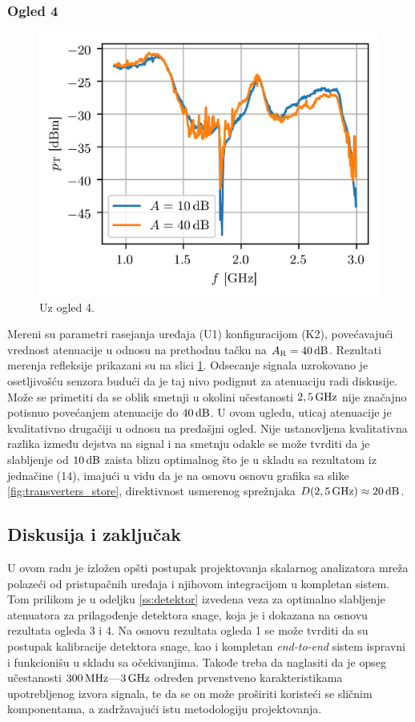 \documentclass[a4paper, 12pt, diplomski]{etf}
\renewcommand{\unit}[1]{\,{\rm #1}}   %
\begin{document}
\subsubsection{Ogled 4}
%
\begin{figure}[b!]
    \centering
    \includegraphics{fig/pR_bpf2.png}
    \caption{Uz ogled 4.}
    \label{fig:ogled4}
\end{figure}
%
Mereni su parametri rasejanja uređaja (U1) 
konfiguracijom (K2), povećavajući vrednost
atenuacije u odnosu na prethodnu tačku na
$A_{\rm R} = 40\unit{dB}$. Rezultati merenja 
refleksije prikazani su na slici 
\ref{fig:ogled4}. Odsecanje signala  
uzrokovano je osetljivošću senzora budući
da je taj nivo podignut za atenuaciju 
radi diskusije. Može se primetiti da se 
oblik smetnji u okolini učestanosti 
$2,5\unit{GHz}$ nije značajno potisnuo
povećanjem atenuacije do $40\unit{dB}$. 
U ovom ugledu, uticaj atenuacije je kvalitativno drugačiji
u odnosu na pređašjni ogled. Nije 
ustanovljena kvalitativna razlika između dejstva 
na signal i na smetnju odakle se može tvrditi da 
je slabljenje od $10 \unit{dB}$ zaista blizu optimalnog
što je u skladu sa rezultatom iz jednačine (14), 
imajući u vidu 
da je na osnovu osnovu grafika sa slike
\ref{fig:transverters_store}, direktivnost usmerenog
sprežnjaka $D(2,5\unit{GHz}) \approx 
20\unit{dB}$.

\subsection{Diskusija i zaključak}
U ovom radu je izložen opšti postupak projektovanja 
skalarnog analizatora mreža polazeći od pristupačnih uređaja
i njihovom integracijom u kompletan sistem. Tom prilikom je u
odeljku \ref{ss:detektor}
izvedena veza za optimalno slabljenje atenuatora za prilagođenje
detektora snage, koja je i dokazana na osnovu rezultata ogleda 3 i 4. 
Na osnovu rezultata ogleda 1 se može tvrditi da su postupak kalibracije
detektora snage, kao i kompletan \textit{end-to-end} sistem ispravni 
i funkcionišu u skladu sa očekivanjima. Takođe treba da naglasiti
da je opseg učestanosti $300\unit{MHz}$---$3\unit{GHz}$ određen prvenstveno
karakteristikama upotrebljenog izvora signala, te da se on može proširiti
koristeći se sličnim komponentama, a zadržavajući istu metodologiju
projektovanja. 
\end{document}
